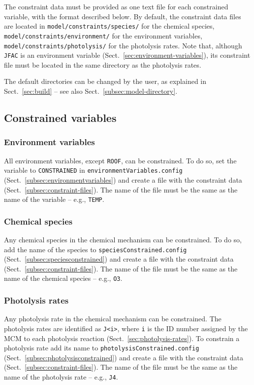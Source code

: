 The constraint data must be provided as one text file for each
constrained variable, with the format described below. By default, the
constraint data files are located in \texttt{model/constraints/species/}
for the chemical species, \texttt{model/constraints/environment/} for
the environment variables, \texttt{model/constraints/photolysis/} for
the photolysis rates. Note that, although \texttt{JFAC} is an
environment variable (Sect.~\ref{sec:environment-variables}), its
constraint file must be located in the same directory as the
photolysis rates.

The default directories can be changed by the user, as explained in
Sect.~\ref{sec:build} -- see also Sect.~\ref{subsec:model-directory}.

\subsection{Constrained variables} \label{subsec:constrained-variables}

\subsubsection{Environment variables}

All environment variables, except \texttt{ROOF}, can be constrained. To do so,
set the variable to \texttt{CONSTRAINED} in \texttt{environmentVariables.config}
(Sect.~\ref{subsec:environmentvariables}) and create a file with the constraint
data (Sect.~\ref{subsec:constraint-files}). The name of the file must be the
same as the name of the variable -- e.g., \texttt{TEMP}.

\subsubsection{Chemical species}

Any chemical species in the chemical mechanism can be constrained. To
do so, add the name of the species to \texttt{speciesConstrained.config}
(Sect.~\ref{subsec:speciesconstrained}) and create a file with the
constraint data (Sect.~\ref{subsec:constraint-files}). The name of the file
must be the same as the name of the chemical species -- e.g., \texttt{O3}.

\subsubsection{Photolysis rates}

Any photolysis rate in the chemical mechanism can be constrained. The
photolysis rates are identified as \texttt{J<i>}, where \texttt{i} is
the ID number assigned by the MCM to each photolysis reaction
(Sect.~\ref{sec:photolysis-rates}). To constrain a photolysis rate add
its name to \texttt{photolysisConstrained.config}
(Sect.~\ref{subsec:photolysisconstrained}) and create a file with the
constraint data (Sect.~\ref{subsec:constraint-files}). The name of the
file must be the same as the name of the photolysis rate -- e.g.,
\texttt{J4}.\\

